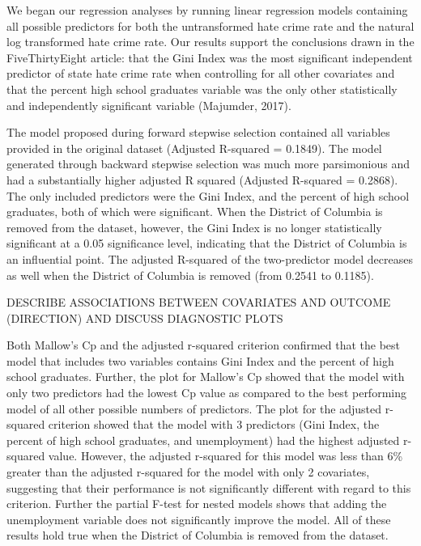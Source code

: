 \documentclass[
]{article}
\begin{document}
We began our regression analyses by running linear regression models
containing all possible predictors for both the untransformed hate crime
rate and the natural log transformed hate crime rate. Our results
support the conclusions drawn in the FiveThirtyEight article: that the
Gini Index was the most significant independent predictor of state hate
crime rate when controlling for all other covariates and that the
percent high school graduates variable was the only other statistically
and independently significant variable (Majumder, 2017).

The model proposed during forward stepwise selection contained all
variables provided in the original dataset (Adjusted R-squared =
0.1849). The model generated through backward stepwise selection was
much more parsimonious and had a substantially higher adjusted R squared
(Adjusted R-squared = 0.2868). The only included predictors were the
Gini Index, and the percent of high school graduates, both of which were
significant. When the District of Columbia is removed from the dataset,
however, the Gini Index is no longer statistically significant at a 0.05
significance level, indicating that the District of Columbia is an
influential point. The adjusted R-squared of the two-predictor model
decreases as well when the District of Columbia is removed (from 0.2541
to 0.1185).

DESCRIBE ASSOCIATIONS BETWEEN COVARIATES AND OUTCOME (DIRECTION) AND
DISCUSS DIAGNOSTIC PLOTS

Both Mallow's Cp and the adjusted r-squared criterion confirmed that the
best model that includes two variables contains Gini Index and the
percent of high school graduates. Further, the plot for Mallow's Cp
showed that the model with only two predictors had the lowest Cp value
as compared to the best performing model of all other possible numbers
of predictors. The plot for the adjusted r-squared criterion showed that
the model with 3 predictors (Gini Index, the percent of high school
graduates, and unemployment) had the highest adjusted r-squared value.
However, the adjusted r-squared for this model was less than 6\% greater
than the adjusted r-squared for the model with only 2 covariates,
suggesting that their performance is not significantly different with
regard to this criterion. Further the partial F-test for nested models
shows that adding the unemployment variable does not significantly
improve the model. All of these results hold true when the District of
Columbia is removed from the dataset.
\end{document}
